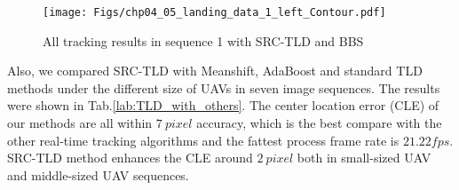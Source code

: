 \begin{figure}[!th]
	\centering
	\texttt{[image: Figs/chp04\_05\_landing\_data\_1\_left\_Contour.pdf]}
	\caption{All tracking results in sequence 1 with SRC-TLD and BBS}
	\label{fig:chp04_05_landing_data_1_left_Contour}    
\end{figure}

Also, we compared SRC-TLD with Meanshift, AdaBoost and standard TLD methods under the different size of UAVs in seven image sequences. The results were shown in Tab.\ref{lab:TLD_with_others}. The center location error (CLE) of our methods are all within $7\ pixel$ accuracy, which is the best compare with the other real-time tracking algorithms and the fattest process frame rate is $21.22 fps$. SRC-TLD method enhances the CLE around $2\ pixel$ both in small-sized UAV and middle-sized UAV sequences.

